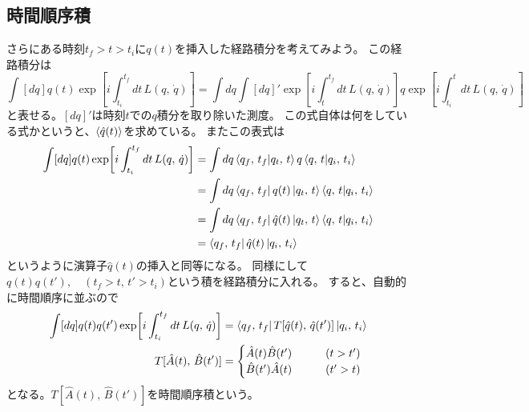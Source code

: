 \documentclass[../../master.tex]{subfiles}
\begin{document}
\subsection*{時間順序積}
さらにある時刻\(t_f>t>t_i\)に\(q(t)\)を挿入した経路積分を考えてみよう。
この経路積分は
\begin{equation}
    \int [dq] q(t) \exp[i\int_{t_i}^{t_f}dt\, L(q,\,\dot{q})]
    = \int dq \int [dq]' \exp[i\int_{t}^{t_f}dt\, L(q,\,\dot{q})]q\exp[i\int_{t_i}^{t}dt\, L(q,\,\dot{q})]
\end{equation}
と表せる。\([dq]'\)は時刻\(t\)での\(q\)積分を取り除いた測度。
この式自体は何をしている式かというと、\(\ev{\hat{q}(t)}\)を求めている。
またこの表式は
\begin{align}
    \int [dq] q(t) \exp[i\int_{t_i}^{t_f}dt\, L(q,\,\dot{q})]
    &= \int dq \braket{q_f,\,t_f}{q_t,\,t} q \braket{q,\,t}{q_i,\,t_i}\notag \\
    &= \int dq \bra{q_f,\,t_f}q(t)\ket{q_t,\,t}\braket{q,\,t}{q_i,\,t_i}\notag \\
    &= \int dq \bra{q_f,\,t_f}\hat{q}(t)\ket{q_t,\,t}\braket{q,\,t}{q_i,\,t_i}\notag \\
    &= \bra{q_f,\,t_f} \hat{q}(t) \ket{q_i,\,t_i}
\end{align}
というように演算子\(\hat{q}(t)\)の挿入と同等になる。
同様にして\(q(t)q(t'),\quad (t_f>t,\,t' >t_i)\)という積を経路積分に入れる。
すると、自動的に時間順序に並ぶので
\begin{align}
    \int[dq] q(t)q(t')\exp[i\int_{t_i}^{t_f}dt\, L(q,\,\dot{q})]
    &=\bra{q_f,\,t_f} T[\hat{q}(t),\,\hat{q}(t')] \ket{q_i,\,t_i}\\
    T[\hat{A}(t),\,\hat{B}(t')]
    &=
    \begin{cases}
        \hat{A}(t)\hat{B}(t') &\qquad(t>t')\\
        \hat{B}(t')\hat{A}(t) &\qquad(t'>t)
    \end{cases}
\end{align}
となる。\(T[\hat{A}(t),\,\hat{B}(t')]\)を時間順序積という。
\end{document}
